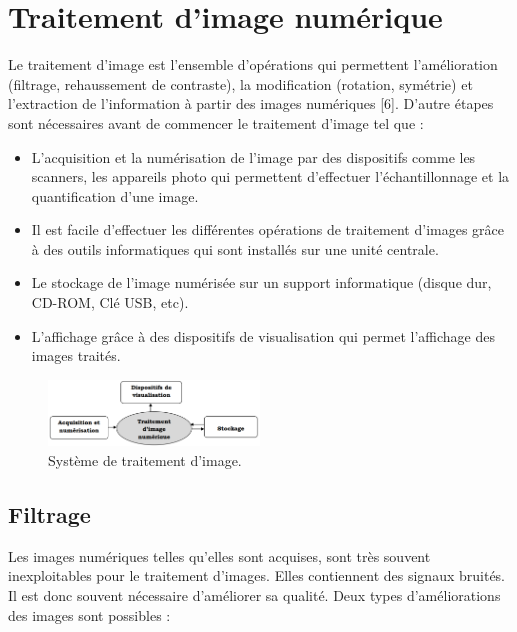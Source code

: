 \section{Traitement d'image numérique}
Le traitement d'image est l’ensemble d’opérations qui permettent
l’amélioration (filtrage, rehaussement de contraste), la modification (rotation, symétrie) et l’extraction de l’information à partir des images numériques [6].
D'autre étapes sont nécessaires avant de commencer le traitement d’image
tel que :
\begin{itemize}
	\item L’acquisition et la numérisation de l’image par des dispositifs comme les scanners, les appareils photo qui permettent d’effectuer l’échantillonnage et la quantification d’une image.
	
	\item Il est facile d’effectuer les différentes opérations de traitement d’images grâce à des outils informatiques qui sont installés sur une unité centrale.
	
	\item Le stockage de l’image numérisée sur un support informatique (disque dur, CD-ROM, Clé USB, etc).
	
	\item L’affichage grâce à des dispositifs de visualisation qui permet l’affichage des images traités.
\end{itemize}

\begin{figure}[H]
	\centering
	\includegraphics[width=0.5\textwidth]{Figures/tin} 
	\caption{Système de traitement d’image.}
\end{figure}

\subsection{Filtrage}
Les images numériques telles qu'elles sont acquises, sont très souvent
inexploitables pour le traitement d'images. Elles contiennent des signaux
bruités. Il est donc souvent nécessaire d'améliorer sa qualité. Deux types
d’améliorations des images sont possibles :


